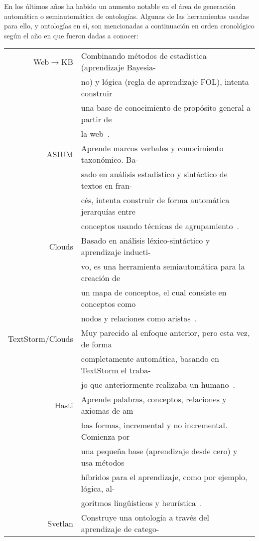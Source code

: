 En los últimos años ha habido un aumento notable en el área de generación automática o semiautomática de ontologías. Algunas de las herramientas usadas para ello, y ontologías en sí, son mencionadas a continuación en orden cronológico según el año en que fueron dadas a conocer:

\begin{table}[H]
	\begin{tabular}{rl}
		Web$\rightarrow$KB & Combinando métodos de estadística (aprendizaje Bayesia- \\
		& no) y lógica (regla de aprendizaje FOL), intenta construir \\
		& una base de conocimiento de propósito general a partir de \\
		& la web~\cite{ref:45,ref:46}.\\
		ASIUM & Aprende marcos verbales y conocimiento taxonómico. Ba- \\
		& sado en análisis estadístico y sintáctico de textos en fran- \\
		& cés, intenta construir de forma automática jerarquías entre \\
		& conceptos usando técnicas de agrupamiento~\cite{ref:49,ref:47,ref:48}. \\
		Clouds & Basado en análisis léxico-sintáctico y aprendizaje inducti- \\
		& vo, es una herramienta semiautomática para la creación de \\
		& un mapa de conceptos, el cual consiste en conceptos como \\
		& nodos y relaciones como aristas~\cite{ref:50}.\\
		TextStorm/Clouds & Muy parecido al enfoque anterior, pero esta vez, de forma \\
		& completamente automática, basando en TextStorm el traba- \\
		& jo que anteriormente realizaba un humano~\cite{ref:51}.\\
		Hasti & Aprende palabras, conceptos, relaciones y axiomas de am- \\
		& bas formas, incremental y no incremental. Comienza por \\
		& una pequeña base (aprendizaje desde cero) y usa métodos \\
		& híbridos para el aprendizaje, como por ejemplo, lógica, al- \\
		& goritmos lingüísticos y heurística~\cite{ref:52,ref:53,ref:54,ref:55}.\\
		Svetlan & Construye una ontología a través del aprendizaje de catego- \\

\end{tabular}
\end{table}
